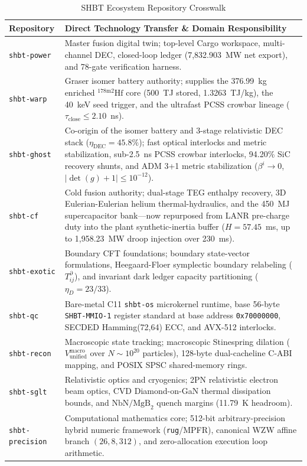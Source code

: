 \documentclass[11pt,journal,compsoc]{IEEEtran}
\begin{document}
\begin{table}[t]
\centering
\caption{SHBT Ecosystem Repository Crosswalk}
\label{tab:crosswalk}
\footnotesize
\setlength{\tabcolsep}{4pt}
\begin{tabular}{l>{\raggedright\arraybackslash}p{5.3cm}}
\toprule
\textbf{Repository} & \textbf{Direct Technology Transfer \& Domain Responsibility} \\
\midrule
\texttt{shbt-power}     & Master fusion digital twin; top-level Cargo workspace, multi-channel DEC, closed-loop ledger (7,832.903~MW net export), and 78-gate verification harness. \\
\texttt{shbt-warp}      & Graser isomer battery authority; supplies the 376.99~kg enriched $^{178\mathrm{m}2}\mathrm{Hf}$ core (500~TJ stored, 1.3263~TJ/kg), the 40~keV seed trigger, and the ultrafast PCSS crowbar lineage ($\tau_{\mathrm{close}} \le 2.10$~ns). \\
\texttt{shbt-ghost}     & Co-origin of the isomer battery and 3-stage relativistic DEC stack ($\eta_{\mathrm{DEC}} = 45.8\%$); fast optical interlocks and metric stabilization, sub-2.5~ns PCSS crowbar interlocks, 94.20\% SiC recovery shunts, and ADM 3+1 metric stabilization ($\beta^i \to 0$, $|\det(g)+1| \le 10^{-12}$). \\
\texttt{shbt-cf}        & Cold fusion authority; dual-stage TEG enthalpy recovery, 3D Eulerian-Eulerian helium thermal-hydraulics, and the 450~MJ supercapacitor bank---now repurposed from LANR pre-charge duty into the plant synthetic-inertia buffer ($H = 57.45$~ms, up to 1,958.23~MW droop injection over 230~ms). \\
\texttt{shbt-exotic}    & Boundary CFT foundations; boundary state-vector formulations, Heegaard-Floer symplectic boundary relabeling ($T^\partial_{ij}$), and invariant dark ledger capacity partitioning ($\eta_D = 23/33$). \\
\texttt{shbt-qc}        & Bare-metal C11 \texttt{shbt-os} microkernel runtime, base 56-byte \texttt{SHBT-MMIO-1} register standard at base address \texttt{0x70000000}, SECDED Hamming(72,64) ECC, and AVX-512 interlocks. \\
\texttt{shbt-recon}     & Macroscopic state tracking; macroscopic Stinespring dilation ($V_{\text{unified}}^{\text{macro}}$ over $N \sim 10^{20}$ particles), 128-byte dual-cacheline C-ABI mapping, and POSIX SPSC shared-memory rings. \\
\texttt{shbt-sglt}      & Relativistic optics and cryogenics; 2PN relativistic electron beam optics, CVD Diamond-on-GaN thermal dissipation bounds, and $\text{NbN}/\text{MgB}_2$ quench margins (11.79~K headroom). \\
\texttt{shbt-precision} & Computational mathematics core; 512-bit arbitrary-precision hybrid numeric framework (\texttt{rug}/MPFR), canonical WZW affine branch $(26, 8, 312)$, and zero-allocation execution loop arithmetic. \\
\bottomrule
\end{tabular}
\end{table}
\end{document}
